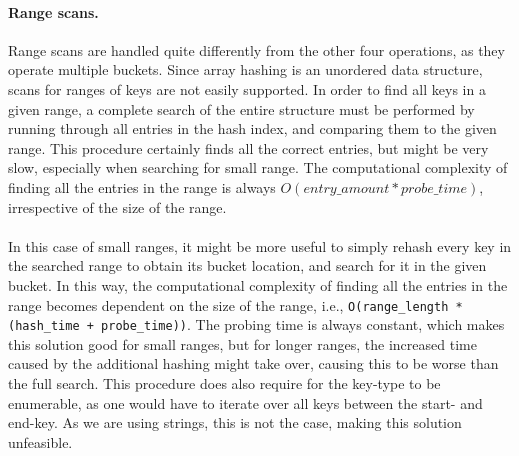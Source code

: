 \documentclass[11pt]{report} %
\begin{document}
\paragraph{Range scans.} Range scans are handled quite differently from the other four operations, as they operate multiple buckets. Since array hashing is an unordered data structure, scans for ranges of keys are not easily supported. In order to find all keys in a given range, a complete search of the entire structure must be performed by running through all entries in the hash index, and comparing them to the given range. This procedure certainly finds all the correct entries, but might be very slow, especially when searching for small range. The computational complexity of finding all the entries in the range is always $O(entry\_amount * probe\_time)$, irrespective of the size of the range. \\
\\
In this case of small ranges, it might be more useful to simply rehash every key in the searched range to obtain its bucket location, and search for it in the given bucket. In this way, the computational complexity of finding all the entries in the range becomes dependent on the size of the range, i.e., \verb|O(range_length * (hash_time + probe_time))|. The probing time is always constant, which makes this solution good for small ranges, but for longer ranges, the increased time caused by the additional hashing might take over, causing this to be worse than the full search. This procedure does also require for the key-type to be enumerable, as one would have to iterate over all keys between the start- and end-key. As we are using strings, this is not the case, making this solution unfeasible.
\end{document}
